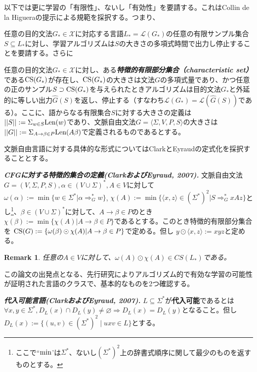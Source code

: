 \documentclass{jsbook}
\renewcommand{\emptyset}{\varnothing}
\newtheorem{remark}{Remark}
\begin{document}
以下では更に学習の「有限性」、ないし「有効性」を要請する。これはCollin de la Higuera\cite{Higuera:1997}の提示による規範を採択する。つまり、

任意の目的文法$G_*\in\mathcal{X}$に対応する言語$L_*=\mathcal{L}(G_*)$の任意の有限サンプル集合$S\subseteq L_*$に対し、学習アルゴリズムは$S$の大きさの多項式時間で出力し停止することを要請する。さらに

任意の目的文法$G_*\in\mathcal{X}$に対し、ある{\bf  \emph{特徴的有限部分集合（characteristic set）}}である${\rm CS}(G_*)$が存在し、${\rm CS}(G_*)$の大きさは文法$G$の多項式量であり、かつ任意の正のサンプル$S\supset{\rm CS}(G_*)$を与えられたときアルゴリズムは目的文法$G_*$と外延的に等しい出力$\hat{G}(S)$を返し、停止する（すなわち$\mathcal{L}(G_*)=\mathcal{L}(\hat{G}(S))$である）。ここに、語からなる有限集合$S$に対する大きさの定義は$||S||:=\Sigma_{w\in S}{\rm Len}(w)$であり、文脈自由文法$G=\langle\Sigma, V, P, S\rangle$の大きさは$||G||:=\Sigma_{A\to\beta\in P}{\rm Len}(A\beta)$で定義されるものであるとする。


文脈自由言語に対する具体的な形式についてはClarkとEyraudの定式化を採択することとする。
\begin{flushleft}
\emph{\bf{CFGに対する特徴的集合の定義(ClarkおよびEyraud, 2007).}} 文脈自由文法$G=(V,\Sigma,P,S), \alpha\in(V\cup\Sigma)^*,A\in V$に対して$\omega(\alpha):=\min\{w\in\Sigma^*|\alpha\Rightarrow^*_Gw\}$, $\chi(A):=\min\{\langle x,z\rangle\in(\Sigma^*)^2|S\Rightarrow^*_GxAz\}$とし\footnote{ここで``${\rm min}$'は$\Sigma^*$、ないし$(\Sigma^*)^2$上の辞書式順序に関して最少のものを返すものとする。}、$\beta\in(V\cup\Sigma)^*$に対して、$A\to\beta\in P$のとき$\chi(\beta):=\min\{\chi(A)|A\to\beta\in P\}$であるとする。このとき特徴的有限部分集合を ${\rm CS}(G):=\{\omega(\beta)\odot\chi(A)|A\to\beta\in P\}$で定める。但し $y\odot\langle x,z\rangle :=xyz$と定める。
\end{flushleft}

\begin{remark}
任意の$A\in V$に対して、$\omega(A)\odot\chi(A)\in CS(L_*)$である。
\end{remark}


この論文の出発点となる、先行研究によりアルゴリズム的で有効な学習の可能性が証明された言語のクラスで、基本的なものを2つ確認する。

\begin{flushleft}
\emph{\bf{代入可能言語(ClarkおよびEyraud, 2007).}} $L\subseteq\Sigma^*$が{\bf 代入可能}であるとは$\forall x,y\in\Sigma^*, D_L(x)\cap D_L(y)\neq\emptyset\Rightarrow D_L(x)=D_L(y)$となること。但し$D_L(x):=\{(u,v)\in(\Sigma^*)^2\mid uxv\in L\}$とする。
\end{flushleft}
\end{document}
